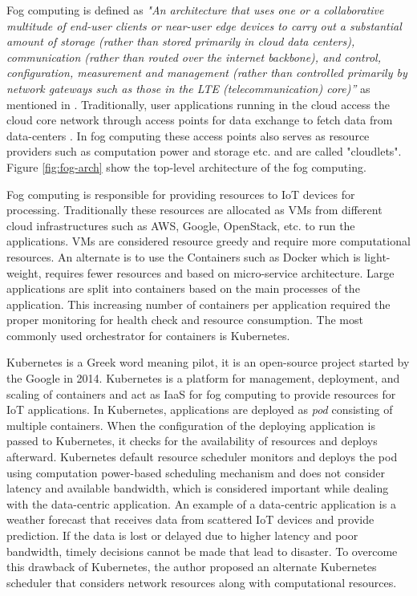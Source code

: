 Fog computing is defined as \emph{"An architecture that uses one or a collaborative multitude of end-user clients or near-user edge devices to carry out a substantial amount of storage (rather than stored primarily in cloud data centers), communication (rather than routed over the internet backbone), and control, configuration, measurement and management (rather than controlled primarily by network gateways such as those in the LTE (telecommunication) core)”} as mentioned in \cite{10.1145/3057266}. Traditionally, user applications running in the cloud access the cloud core network through access points for data exchange to fetch data from data-centers \cite{Bittencourt2017}. In fog computing these access points also serves as resource providers such as computation power and storage etc. and are called "cloudlets"\cite{Bittencourt2017}. Figure \ref{fig:fog-arch} show the top-level architecture of the fog computing. \par
Fog computing is responsible for providing resources to IoT devices for processing\cite{Santos2019}. Traditionally these resources are allocated as VMs from different cloud infrastructures such as AWS, Google, OpenStack, etc. to run the applications. VMs are considered resource greedy and require more computational resources. An alternate is to use the Containers such as Docker which is light-weight, requires fewer resources and based on micro-service architecture. Large applications are split into containers based on the main processes of the application. This increasing number of containers per application required the proper monitoring for health check and resource consumption\cite{k8s}. The most commonly used orchestrator for containers is Kubernetes. \par
Kubernetes is a Greek word meaning pilot, it is an open-source project started by the Google in 2014\cite{k8s}. Kubernetes is a platform for management, deployment, and scaling of containers\cite{k8s} and act as IaaS for fog computing to provide resources for IoT applications. In Kubernetes, applications are deployed as \emph{pod} consisting of multiple containers. When the configuration of the deploying application is passed to Kubernetes, it checks for the availability of resources and deploys afterward\cite{k8s}. Kubernetes default resource scheduler monitors and deploys the pod using computation power-based scheduling mechanism and does not consider latency and available bandwidth, which is considered important while dealing with the data-centric application\cite{Santos2019}. An example of a data-centric application is a weather forecast that receives data from scattered IoT devices and provide prediction. If the data is lost or delayed due to higher latency and poor bandwidth, timely decisions cannot be made that lead to disaster. To overcome this drawback of Kubernetes, the author proposed an alternate Kubernetes scheduler that considers network resources along with computational resources\cite{Santos2019}.
\vspace{-0.10cm}
